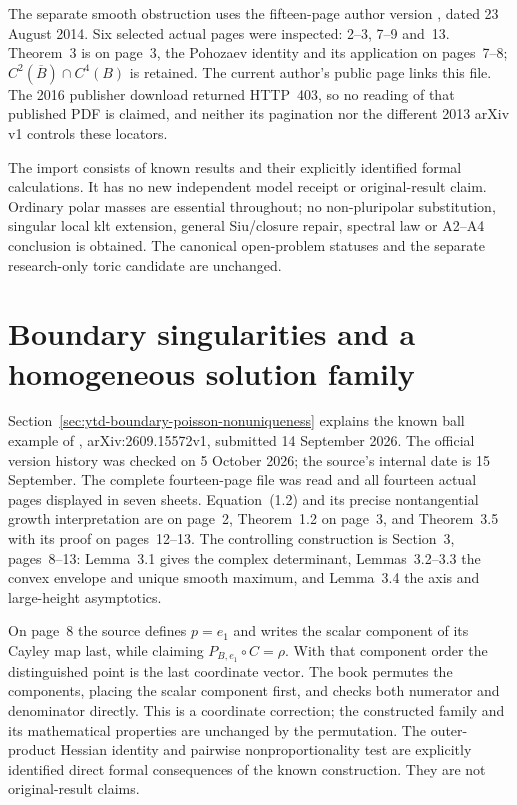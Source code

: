 The separate smooth obstruction uses the fifteen-page author
version \cite{Li14PohozaevAuthor}, dated 23 August 2014.
Six selected actual pages were inspected: 2--3, 7--9 and~13.
Theorem~3 is on page~3, the Pohozaev identity and its application
on pages~7--8; $C^2(\overline B)\cap C^4(B)$ is retained.
The current author's public page links this file. The 2016
publisher download returned HTTP~403, so no reading of that
published PDF is claimed, and neither its pagination nor the
different 2013 arXiv v1 controls these locators.

The import consists of known results and their explicitly
identified formal calculations. It has no new independent model
receipt or original-result claim. Ordinary polar masses are
essential throughout; no non-pluripolar substitution, singular
local klt extension, general Siu/closure repair, spectral law
or A2--A4 conclusion is obtained. The canonical open-problem
statuses and the separate research-only toric candidate are unchanged.

\section{Boundary singularities and a homogeneous solution family}
\label{sec:provenance-boundary-poisson}

Section~\ref{sec:ytd-boundary-poisson-nonuniqueness} explains the known
ball example of \cite{Wang26PoissonV1}, arXiv:2609.15572v1, submitted
14 September 2026. The official version history was checked on
5 October 2026; the source's internal date is 15 September.
The complete fourteen-page file was read and all fourteen actual
pages displayed in seven sheets. Equation~(1.2) and its precise
nontangential growth interpretation are on page~2, Theorem~1.2
on page~3, and Theorem~3.5 with its proof on pages~12--13.
The controlling construction is Section~3, pages~8--13:
Lemma~3.1 gives the complex determinant, Lemmas~3.2--3.3 the
convex envelope and unique smooth maximum, and Lemma~3.4 the
axis and large-height asymptotics.

On page~8 the source defines $p=e_1$ and writes the scalar component
of its Cayley map last, while claiming $P_{B,e_1}\circ C=\rho$.
With that component order the distinguished point is the last
coordinate vector. The book permutes the components, placing the
scalar component first, and checks both numerator and denominator
directly. This is a coordinate correction; the constructed family
and its mathematical properties are unchanged by the permutation.
The outer-product Hessian identity and pairwise nonproportionality
test are explicitly identified direct formal consequences of the
known construction. They are not original-result claims.

